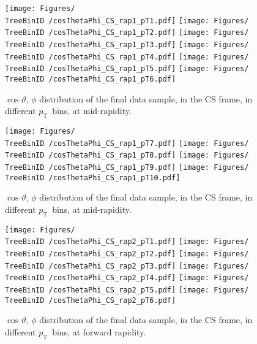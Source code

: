 \documentclass[12pt]{article}
\newcommand{\pt}{$p_{\mathrm{T}}$}
\providecommand{\TreeBinID}[1]{TreeBinIDDefault_rap1pt1}%
\begin{document}

\begin{figure}[htbp]
\centering
\texttt{[image: Figures/\\TreeBinID /cosThetaPhi\_CS\_rap1\_pT1.pdf]}
\texttt{[image: Figures/\\TreeBinID /cosThetaPhi\_CS\_rap1\_pT2.pdf]}
\texttt{[image: Figures/\\TreeBinID /cosThetaPhi\_CS\_rap1\_pT3.pdf]}
\texttt{[image: Figures/\\TreeBinID /cosThetaPhi\_CS\_rap1\_pT4.pdf]}
\texttt{[image: Figures/\\TreeBinID /cosThetaPhi\_CS\_rap1\_pT5.pdf]}
\texttt{[image: Figures/\\TreeBinID /cosThetaPhi\_CS\_rap1\_pT6.pdf]}
\caption{$\cos\vartheta,\,\phi$ distribution of the final data sample, in the CS
frame, in different \pt\ bins, at mid-rapidity.}
\end{figure}
\clearpage

\begin{figure}[htbp]
\centering
\texttt{[image: Figures/\\TreeBinID /cosThetaPhi\_CS\_rap1\_pT7.pdf]}
\texttt{[image: Figures/\\TreeBinID /cosThetaPhi\_CS\_rap1\_pT8.pdf]}
\texttt{[image: Figures/\\TreeBinID /cosThetaPhi\_CS\_rap1\_pT9.pdf]}
\texttt{[image: Figures/\\TreeBinID /cosThetaPhi\_CS\_rap1\_pT10.pdf]}
\caption{$\cos\vartheta,\,\phi$ distribution of the final data sample, in the CS
frame, in different \pt\ bins, at mid-rapidity.}
\end{figure}
\clearpage

\begin{figure}[htbp]
\centering
\texttt{[image: Figures/\\TreeBinID /cosThetaPhi\_CS\_rap2\_pT1.pdf]}
\texttt{[image: Figures/\\TreeBinID /cosThetaPhi\_CS\_rap2\_pT2.pdf]}
\texttt{[image: Figures/\\TreeBinID /cosThetaPhi\_CS\_rap2\_pT3.pdf]}
\texttt{[image: Figures/\\TreeBinID /cosThetaPhi\_CS\_rap2\_pT4.pdf]}
\texttt{[image: Figures/\\TreeBinID /cosThetaPhi\_CS\_rap2\_pT5.pdf]}
\texttt{[image: Figures/\\TreeBinID /cosThetaPhi\_CS\_rap2\_pT6.pdf]}
\caption{$\cos\vartheta,\,\phi$ distribution of the final data sample, in the CS
frame, in different \pt\ bins, at forward rapidity.}
\end{figure}
\clearpage
\end{document}
